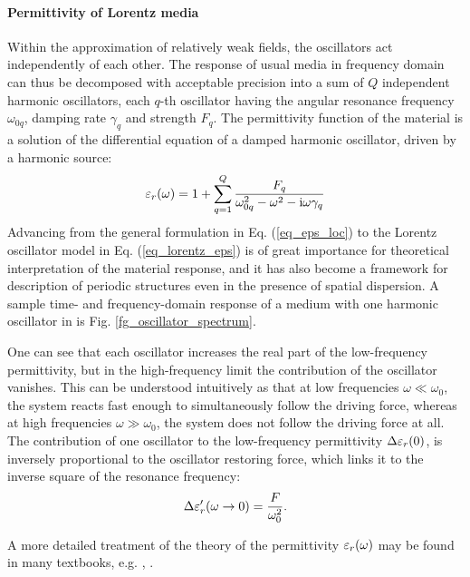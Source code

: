 \paragraph{Permittivity of Lorentz media} Within the approximation of relatively weak fields, the oscillators act independently of each other.
The response of usual media in frequency domain can thus be decomposed with acceptable precision into a sum of $Q$ independent harmonic oscillators, each $q$-th oscillator having the angular resonance frequency $\omega_{0q}$, damping rate $\gamma_q$ and strength $F_q$.
The permittivity function of the material is a solution of the differential equation of a damped harmonic oscillator, driven by a harmonic source:
\begin{equation} \varepsilon_r(\omega) = 1 + \sum_{q=1}^Q \frac{F_q}{\omega_{0q}^2 - \omega^2 - {\mathrm i}\omega\gamma_q} \label{eq_lorentz_eps}\end{equation} 
Advancing from the general formulation in Eq. (\ref{eq_eps_loc}) to the Lorentz oscillator model in Eq. (\ref{eq_lorentz_eps}) is of great importance for theoretical interpretation of the material response, and it has also become a framework for description of periodic structures even in the presence of spatial dispersion.  %
A sample time- and frequency-domain response of a medium with one harmonic oscillator in is Fig. \ref{fg_oscillator_spectrum}.

One can see that each oscillator increases the real part of the low-frequency permittivity, but in the high-frequency limit the contribution of the oscillator vanishes. This can be understood intuitively as that at low frequencies $\omega \ll \omega_0$, the system reacts fast enough to simultaneously follow the driving force, whereas at high frequencies  $\omega \gg \omega_0$, the system does not follow the driving force at all.
The contribution of one oscillator to the low-frequency permittivity $\Delta\varepsilon_r(0)$, is inversely proportional to the oscillator restoring force, which links it to the inverse square of the resonance frequency:
\begin{equation} \Delta \varepsilon_r'(\omega\rightarrow0) = \frac{F}{\omega_0^{2}}.  \label{eq_delta_eps} \end{equation}

A more detailed treatment of the theory of the permittivity $\varepsilon_r(\omega)$ may be found in many textbooks, e.g. \cite[p. 454]{klingshirn2007semiconductor}, \cite{dresselhaus1966optical}. 

